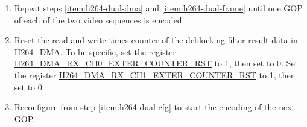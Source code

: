 \documentclass[main\_\_EN.tex]{subfiles}
\begin{document}
\begin{enumerate}
\begin{itemize}
\begin{itemize}
            \item Registers related to the quantization result decimation function, refer to the description in chapter \ref{sec:h264-decimate}.
            \item Registers related to the MB level rate control function, refer to the description in chapter \ref{sec:h264-rate-ctrl}.
            \item Deblocking filter enable register: \hyperref[fielddesc:H264ABYPASSDBFILTER]{H264\_A\_BYPASS\_DB\_FILTER}.
            \item ROI function related registers, refer to the description in chapter \ref{sec:h264-roi}.
            \item Registers related to the slice header information: \hyperref[fielddesc:H264SLICEREMAINBIT]{H264\_SLICE\_REMAIN\_BIT}, \hyperref[fielddesc:H264SLICEREMAINBITLENGTH]{H264\_SLICE\_REMAIN\_BITLENGTH}, \hyperref[fielddesc:H264SLICEBYTELENGTH]{H264\_SLICE\_BYTE\_LENGTH}, \hyperref[fielddesc:H264SLICEBYTELSB]{H264\_SLICE\_BYTE\_LSB}, and \hyperref[fielddesc:H264SLICEBYTEMSB]{H264\_SLICE\_BYTE\_MSB}.
            \item Registers related to the MV merge function, refer to the description in chapter \ref{sec:h264-mv-merge}.
            \item Registers related to the debug function. Refer to chapter \ref{sec:h264-debug-func} for details.
        \end{itemize}
    \end{itemize}
    \item Repeat steps \ref{item:h264-dual-dma} and \ref{item:h264-dual-frame} until one GOP of each of the two video sequences is encoded.
    \item Reset the read and write times counter of the deblocking filter result data in H264\_DMA. To be specific, set the register \hyperref[fielddesc:H264DMARXCH0EXTERCOUNTERRST]{H264\_DMA\_RX\_CH0\_EXTER\_COUNTER\_RST} to 1, then set to 0. Set the register \hyperref[fielddesc:H264DMARXCH1EXTERCOUNTERRST]{H264\_DMA\_RX\_CH1\_EXTER\_COUNTER\_RST} to 1, then set to 0.
    \item Reconfigure from step \ref{item:h264-dual-cfg} to start the encoding of the next GOP.
\end{enumerate}
\end{document}
